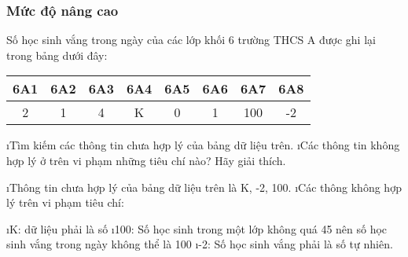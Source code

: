 \subsubsection*{Mức độ nâng cao}
\begin{bt}
	Số học sinh vắng trong ngày của các lớp khối 6 trường THCS A được ghi lại trong bảng dưới đây:
	\begin{center}
		\begin{tabular}{|c|c|c|c|c|c|c|c|}
			\hline
			6A1&	6A2&	6A3&	6A4&	6A5&	6A6&	6A7&	6A8\\
			\hline
			2	&1&	4&	K&	0&	1&	100& -2\\
			\hline
		\end{tabular}
	\end{center}
	\begin{enumerate}[a),leftmargin=*]
	\i	Tìm kiếm các thông tin chưa hợp lý của bảng dữ liệu trên. 
	\i	Các thông tin không hợp lý ở trên vi phạm những tiêu chí nào? Hãy giải thích. 
	\end{enumerate}
	\begin{loigiaichuong39}
		\begin{enumerate}[a),leftmargin=*]
			\i Thông tin chưa hợp lý của bảng dữ liệu trên là K, -2, 100.
			\i Các thông không hợp lý trên vi phạm tiêu chí: 
			\begin{enumerate}[-,leftmargin=*]
				\i K: dữ liệu phải là số
				\i 100: Số học sinh trong một lớp không quá 45 nên số học sinh vắng trong ngày không thể là 100
				\i -2: Số học sinh vắng phải là số tự nhiên.
			\end{enumerate}	
		\end{enumerate}
	\end{loigiaichuong39}
\end{bt}
